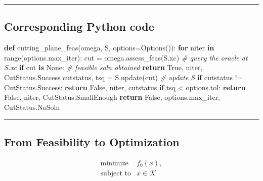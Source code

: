 \documentclass[
]{article}
\newenvironment{Shaded}{}{}
\newcommand{\BuiltInTok}[1]{\textcolor[rgb]{0.00,0.50,0.00}{#1}}
\newcommand{\CommentTok}[1]{\textcolor[rgb]{0.38,0.63,0.69}{\textit{#1}}}
\newcommand{\ControlFlowTok}[1]{\textcolor[rgb]{0.00,0.44,0.13}{\textbf{#1}}}
\newcommand{\KeywordTok}[1]{\textcolor[rgb]{0.00,0.44,0.13}{\textbf{#1}}}
\newcommand{\NormalTok}[1]{#1}
\newcommand{\OperatorTok}[1]{\textcolor[rgb]{0.40,0.40,0.40}{#1}}
\newcommand{\VariableTok}[1]{\textcolor[rgb]{0.10,0.09,0.49}{#1}}
\begin{document}
\begin{center}\rule{0.5\linewidth}{0.5pt}\end{center}

\subsection{Corresponding Python code}\label{corresponding-python-code}

\begin{Shaded}
\begin{Highlighting}[]
\KeywordTok{def}\NormalTok{ cutting\_plane\_feas(omega, S, options}\OperatorTok{=}\NormalTok{Options()):}
    \ControlFlowTok{for}\NormalTok{ niter }\KeywordTok{in} \BuiltInTok{range}\NormalTok{(options.max\_iter):}
\NormalTok{        cut }\OperatorTok{=}\NormalTok{ omega.assess\_feas(S.xc)  }\CommentTok{\# query the oracle at S.xc}
        \ControlFlowTok{if}\NormalTok{ cut }\KeywordTok{is} \VariableTok{None}\NormalTok{:  }\CommentTok{\# feasible sol\textquotesingle{}n obtained}
            \ControlFlowTok{return} \VariableTok{True}\NormalTok{, niter, CutStatus.Success}
\NormalTok{        cutstatus, tsq }\OperatorTok{=}\NormalTok{ S.update(cut)  }\CommentTok{\# update S}
        \ControlFlowTok{if}\NormalTok{ cutstatus }\OperatorTok{!=}\NormalTok{ CutStatus.Success:}
            \ControlFlowTok{return} \VariableTok{False}\NormalTok{, niter, cutstatus}
        \ControlFlowTok{if}\NormalTok{ tsq }\OperatorTok{\textless{}}\NormalTok{ options.tol:}
            \ControlFlowTok{return} \VariableTok{False}\NormalTok{, niter, CutStatus.SmallEnough}
    \ControlFlowTok{return} \VariableTok{False}\NormalTok{, options.max\_iter, CutStatus.NoSoln}
\end{Highlighting}
\end{Shaded}

\begin{center}\rule{0.5\linewidth}{0.5pt}\end{center}

\subsection{From Feasibility to
Optimization}\label{from-feasibility-to-optimization}

\[\begin{array}{ll}
    \text{minimize}     & f_0(x), \\
    \text{subject to}   & x \in \mathcal{K}
\end{array}\]
\end{document}
